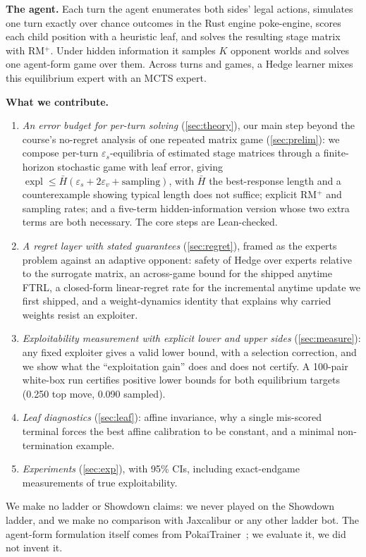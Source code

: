 \documentclass[10pt]{article}
\theoremstyle{plain}
\theoremstyle{definition}
\theoremstyle{remark}
\newcommand{\Hbar}{\bar H}
\newcommand{\epss}{\varepsilon_s}
\newcommand{\epsv}{\varepsilon_v}
\DeclareMathOperator{\expl}{expl}
\begin{document}
\textbf{The agent.} Each turn the agent enumerates both sides' legal actions, simulates one turn exactly over chance outcomes in the Rust engine poke-engine, scores each child position with a heuristic leaf, and solves the resulting stage matrix with RM$^+$. Under hidden information it samples $K$ opponent worlds and solves one agent-form game over them. Across turns and games, a Hedge learner mixes this equilibrium expert with an MCTS expert.

\textbf{What we contribute.}
\begin{enumerate}[label=(\arabic*)]
\item \emph{An error budget for per-turn solving} (\cref{sec:theory}), our main step beyond the course's no-regret analysis of one repeated matrix game (\cref{sec:prelim}): we compose per-turn $\epss$-equilibria of estimated stage matrices through a finite-horizon stochastic game with leaf error, giving $\expl\le\Hbar(\epss+2\epsv+\text{sampling})$, with $\Hbar$ the best-response length and a counterexample showing typical length does not suffice; explicit RM$^+$ and sampling rates; and a five-term hidden-information version whose two extra terms are both necessary. The core steps are Lean-checked.
\item \emph{A regret layer with stated guarantees} (\cref{sec:regret}), framed as the experts problem against an adaptive opponent: safety of Hedge over experts relative to the surrogate matrix, an across-game bound for the shipped anytime FTRL, a closed-form linear-regret rate for the incremental anytime update we first shipped, and a weight-dynamics identity that explains why carried weights resist an exploiter.
\item \emph{Exploitability measurement with explicit lower and upper sides} (\cref{sec:measure}): any fixed exploiter gives a valid lower bound, with a selection correction, and we show what the ``exploitation gain'' does and does not certify. A 100-pair white-box run certifies positive lower bounds for both equilibrium targets (0.250 top move, 0.090 sampled).
\item \emph{Leaf diagnostics} (\cref{sec:leaf}): affine invariance, why a single mis-scored terminal forces the best affine calibration to be constant, and a minimal non-termination example.
\item \emph{Experiments} (\cref{sec:exp}), with 95\% CIs, including exact-endgame measurements of true exploitability.
\end{enumerate}
We make no ladder or Showdown claims: we never played on the Showdown ladder, and we make no comparison with Jaxcalibur or any other ladder bot. The agent-form formulation itself comes from PokaiTrainer~\cite{Yu26}; we evaluate it, we did not invent it.
\end{document}
